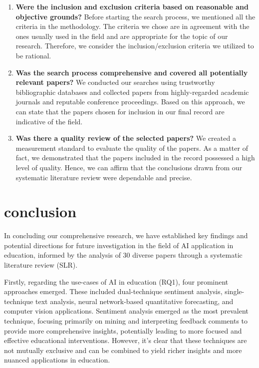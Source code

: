 \documentclass{svproc}
\begin{document}
\begin{enumerate}

\item \textbf{Were the inclusion and exclusion criteria based on reasonable and objective grounds?}
Before starting the search process, we mentioned all the criteria in the methodology. The criteria we chose are in agreement with the ones usually used in the field and are appropriate for the topic of our research. Therefore, we consider the inclusion/exclusion criteria we utilized to be rational.
\item \textbf{Was the search process comprehensive and covered all potentially relevant papers?}
We conducted our searches using trustworthy bibliographic databases and collected papers from highly-regarded academic journals and reputable conference proceedings. Based on this approach, we can state that the papers chosen for inclusion in our final record are indicative of the field.

\item \textbf{Was there a quality review of the selected papers?}
We created a measurement standard to evaluate the quality of the papers. As a matter of fact, we demonstrated that the papers included in the record possessed a high level of quality. Hence, we can affirm that the conclusions drawn from our systematic literature review were dependable and precise.
\end{enumerate}


\section{conclusion}
\label{conclusion}
In concluding our comprehensive research, we have established key findings and potential directions for future investigation in the field of AI application in education, informed by the analysis of 30 diverse papers through a systematic literature review (SLR).

Firstly, regarding the use-cases of AI in education (RQ1), four prominent approaches emerged. These included dual-technique sentiment analysis, single-technique text analysis, neural network-based quantitative forecasting, and computer vision applications. Sentiment analysis emerged as the most prevalent technique, focusing primarily on mining and interpreting feedback comments to provide more comprehensive insights, potentially leading to more focused and effective educational interventions. However, it's clear that these techniques are not mutually exclusive and can be combined to yield richer insights and more nuanced applications in education.
\end{document}
